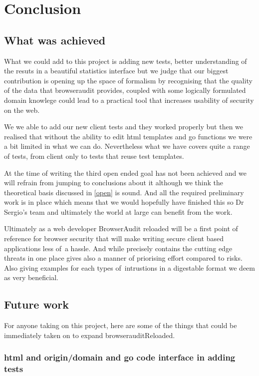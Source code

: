 
\chapter{Conclusion} 

\section{What was achieved}

What we could add to this project is adding new tests, better understanding of the resuts in a beautiful statistics interface but we judge
that our biggest contribution is opening up the space of formalism by recognising that the quality of the data that browseraudit provides, coupled
with some logically formulated domain knowlege could lead to a practical tool that increases usability of security on the web.

We we able to add our new client tests and they worked properly but then we realised that without the ability to edit html templates and go functions
we were a bit limited in what we can do. Nevertheless what we have covers quite a range of tests, from client only to tests that reuse test templates.

At the time of writing the third open ended goal has not been achieved and we will refrain from jumping to conclusions about it although we think the theoretical basis
discussed in \ref{open} is sound. And all the required preliminary work is in place which means that we would hopefully have finished this so Dr Sergio's team and ultimately
the world at large can benefit from the work.

Ultimately as a web developer BrowserAudit reloaded will be a first point of reference for browser security that will make writing secure client based applications less of\
a hassle. And while precisely contains the cutting edge threats in one place gives also a manner of priorising effort compared to risks. Also giving examples for each types of\
intrustions in a digestable format we deem as very beneficial.\

\section{Future work}


For anyone taking on this project, here are some of the things that could be immediately taken on to expand browserauditReloaded.

\subsection{html and origin/domain and go code interface in adding tests}

